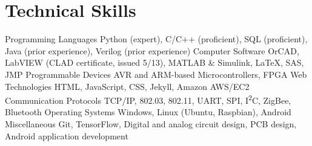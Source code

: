\section{Technical Skills}
\begin{cvskills}
  \cvskill
    {Programming Languages}
    {Python (expert), C/C++ (proficient), SQL (proficient), Java (prior experience), Verilog (prior experience)}
  \cvskill
    {Computer Software}
    {OrCAD, LabVIEW (CLAD certificate, issued 5/13), MATLAB \& Simulink, \LaTeX, SAS, JMP}
  \cvskill
    {Programmable Devices}
    {AVR and ARM-based Microcontrollers, FPGA}
  \cvskill
    {Web Technologies}
    {HTML, JavaScript, CSS, Jekyll, Amazon AWS/EC2}
  \cvskill
    {Communication Protocols}
    {TCP/IP, 802.03, 802.11, UART, SPI, I\textsuperscript{2}C, ZigBee, Bluetooth}
  \cvskill
    {Operating Systems}
    {Windows, Linux (Ubuntu, Raspbian), Android}
  \cvskill
    {Miscellaneous}
    {Git, TensorFlow, Digital and analog circuit design, PCB design, Android application development}
\end{cvskills} 